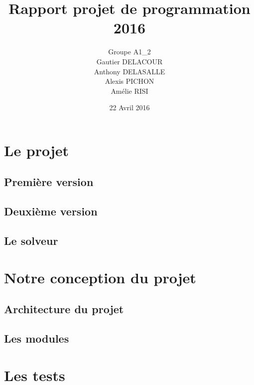 \documentclass{report}
\title{Rapport projet de programmation 2016}
\author{Groupe A1\_2\\Gautier DELACOUR\\Anthony DELASALLE\\Alexis PICHON\\Amélie RISI}
\date{22 Avril 2016}
\begin{document}
\maketitle
\tableofcontents

\part{Le projet}%
\chapter{Première version}

\chapter{Deuxième version}

\chapter{Le solveur}



\part{Notre conception du projet}
\setcounter{chapter}{0}
\chapter{Architecture du projet}

\chapter{Les modules}



\part{Les tests}
\setcounter{chapter}{0}
\end{document}
